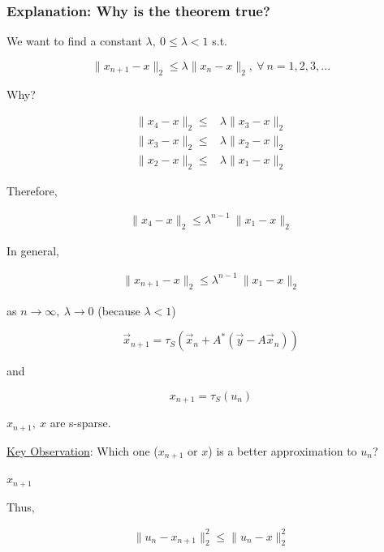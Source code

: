 \documentclass[11pt]{article}
\begin{document}
\subsubsection{Explanation: Why is the theorem true?}
\label{sec:orgcfd637c}

We want to find a constant \(\lambda, \ 0 \leq \lambda < 1\) s.t.

$$
\|x_{n+1} - x\|_2 \leq \lambda \|x_n - x\|_2, \ \forall \ n = 1,2,3,...
$$

Why?

\begin{equation}
\begin{split}
\|x_4 - x\|_2 \leq & \lambda \|x_3 - x\|_2\\
\|x_3 - x\|_2 \leq & \lambda \|x_2 - x\|_2\\
\|x_2 - x\|_2 \leq & \lambda \|x_1 - x\|_2
\end{split}
\end{equation}

Therefore,

\begin{equation}
\begin{split}
\|x_4 - x\|_2 \leq \lambda^{n - 1} \ \|x_1 - x\|_2
\end{split}
\end{equation}


In general,

\begin{equation}
\begin{split}
\|x_{n + 1} - x\|_2 \leq \lambda^{n - 1} \ \|x_1 - x\|_2
\end{split}
\end{equation}

as \(n \to \infty, \ \lambda \to 0\) (because \(\lambda < 1\))


$$
\vec x_{n + 1} = \tau_S (\vec x_n + A^* (\vec y - A \vec x_n))
$$

and

$$
x_{n + 1} = \tau_S (u_n)
$$

\(x_{n + 1}, \ x\) are s-sparse.

\uline{Key Observation}: Which one (\(x_{n + 1}\) or \(x\)) is a better approximation to
\(u_n\)?

\(x_{n + 1}\)

Thus,

\begin{equation}
\begin{split}
\|u_n - x_{n + 1}\|_2^2 \leq \|u_n - x\|_2^2
\end{split}
\end{equation}
\end{document}

